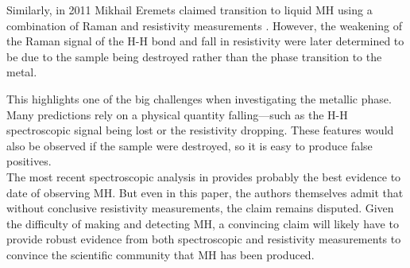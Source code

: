 \documentclass[esp]{FCEFyN-class}
\begin{document}
Similarly, in 2011 Mikhail Eremets claimed transition to liquid MH using a combination of Raman and resistivity measurements \cite{eremets2011}. However, the weakening of the Raman signal of the H-H bond and fall in resistivity were later determined to be due to the sample being destroyed rather than the phase transition to the metal.

This highlights one of the big challenges when investigating the metallic phase. Many predictions rely on a physical quantity falling---such as the H-H spectroscopic signal being lost or the resistivity dropping. These features would also be observed if the sample were destroyed, so it is easy to produce false positives.\\

The most recent spectroscopic analysis in \cite{loubeyre2020} provides probably the best evidence to date of observing MH. But even in this paper, the authors themselves admit that without conclusive resistivity measurements, the claim remains disputed. Given the difficulty of making and detecting MH, a convincing claim will likely have to provide robust evidence from both spectroscopic and resistivity measurements to convince the scientific community that MH has been produced.



\end{document}
